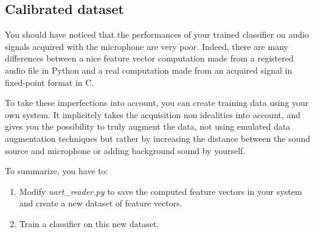\subsection{Calibrated dataset}
%
You should have noticed that the performances of your trained classifier on audio signals acquired with the microphone are very poor. Indeed, there are many differences between a nice feature vector computation made from a registered audio file in Python and a real computation made from an acquired signal in fixed-point format in C.

To take these imperfections into account, you can create training data using your own system. It implicitely takes the acquisition non idealities into account, and gives you the possibility to truly augment the data, not using emulated data augmentation techniques but rather by increasing the distance between the sound source and microphone or adding background sound by yourself.

\noindent To summarize, you have to:
\begin{enumerate}
    \item Modify \emph{uart\_reader.py} to save the computed feature vectors in your system and create a new dataset of feature vectors.
    \item Train a classifier on this new dataset.
\end{enumerate}
